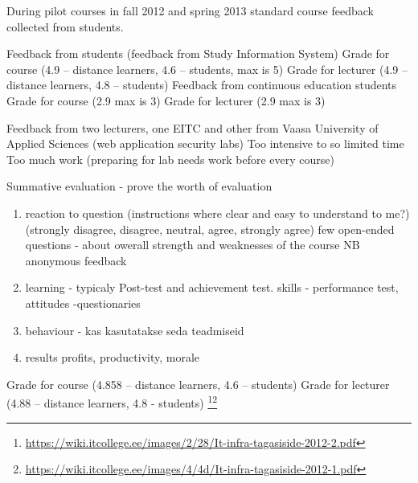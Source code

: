 During pilot courses in fall 2012 and spring 2013 standard course feedback collected from students. 

Feedback from students (feedback from Study Information System)
Grade for course  (4.9 -- distance learners, 4.6 -- students, max is 5) 
Grade for lecturer (4.9 -- distance learners, 4.8 -- students)
Feedback from continuous education students
Grade for course (2.9 max is 3)
Grade for lecturer (2.9 max is 3)



Feedback from two lecturers, one \gls{EITC} and other from Vaasa University of Applied Sciences (web application security labs)
Too intensive to so limited time
Too much work (preparing for lab needs work before every course)


Summative evaluation - prove the worth of evaluation
\begin{enumerate}
\item reaction to question (instructions where clear and easy to understand to me?) (strongly disagree, disagree, neutral, agree, strongly agree) few open-ended questions - about owerall strength and weaknesses of the course NB anonymous feedback
\item learning - typicaly Post-test and achievement test. skills - performance test, attitudes -questionaries
\item behaviour - kas kasutatakse seda teadmiseid
\item results profits, productivity, morale
\end{enumerate}

Grade for course  (4.858 – distance learners, 4.6 – students)
Grade for lecturer (4.88 – distance learners, 4.8 - students) \footnote{\url{https://wiki.itcollege.ee/images/2/28/It-infra-tagasiside-2012-2.pdf}}\footnote{\url{https://wiki.itcollege.ee/images/4/4d/It-infra-tagasiside-2012-1.pdf}}

